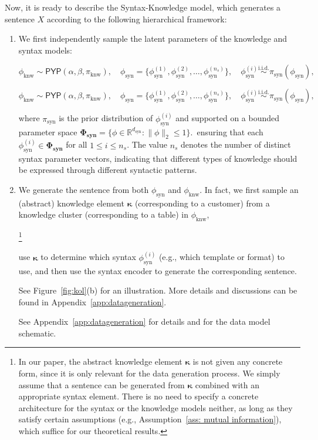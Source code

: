 \documentclass[11pt]{article}
\theoremstyle{plain}
\theoremstyle{definition}
\newcommand{\numsyntax}{n_s}
\newcommand{\knwModel}{\phi_{\text{knw}}}
\newcommand{\synModel}{\phi_{\text{syn}}}
\newcommand{\synfamily}{\mathbf{\Phi_{\text{syn}}}}
\newcommand{\syndimension}{d_{\text{syn}}}
\newcommand{\PYP}{\mathsf{PYP}}
\newcommand{\basemeasure}{\pi_{\text{knw}}}
\newcommand{\synprior}{\pi_{\text{syn}}}
\newcommand{\Knwelem}{\boldsymbol{\kappa}}
\begin{document}
Now, it is ready to describe the Syntax-Knowledge model, which generates a sentence \( X \) according to the following hierarchical framework:
\begin{enumerate}
    \item We first independently sample the latent parameters of the knowledge and syntax models:
    \begin{arxiv}
    \[
    \knwModel \sim \PYP(\alpha, \beta, \basemeasure),\quad 
    \synModel=\{\synModel^{(1)},\synModel^{(2)},\dots,
    \synModel^{(\numsyntax)}\},\quad 
    \synModel^{(i)} \overset{\text{i.i.d.}}{\sim} \synprior(\synModel),
    \]
    \end{arxiv}
    \begin{nips}
    $
    \knwModel \sim \PYP(\alpha, \beta, \basemeasure),\quad 
    \synModel=\{\synModel^{(1)},\synModel^{(2)},\dots,
    \synModel^{(\numsyntax)}\},\quad 
    \synModel^{(i)} \overset{\text{i.i.d.}}{\sim} \synprior(\synModel),
    $
    \end{nips}
    where $\synprior$ is the prior distribution of $\synModel^{(i)}$ and supported on a bounded parameter space \( \synfamily = \{ \phi \in \mathbb{R}^{\syndimension} : \|\phi\|_2 \le 1 \} \).\, ensuring that each \( \synModel^{(i)} \in \synfamily \) for all \( 1\le i\le \numsyntax  \).
    The value \( \numsyntax \) denotes the number of distinct syntax parameter vectors, indicating that different types of knowledge should be expressed through different syntactic patterns.
    \item We generate the sentence from both 
    $\synModel$ and $\knwModel$. In fact, we first sample
    an (abstract) knowledge element $\Knwelem$
    (corresponding to a customer) from a knowledge cluster (corresponding to a table) in $\knwModel$,
    \begin{arxiv}
    \footnote{
       In our paper, the abstract knowledge element \(\Knwelem\) is not given any concrete form, since it is only relevant for the data generation process. We simply assume that a sentence can be generated from \(\Knwelem\) combined with an appropriate syntax element. There is no need to specify a concrete architecture for the syntax or the knowledge models neither, as long as they satisfy certain assumptions (e.g., Assumption~\ref{ass: mutual information}), which suffice for our theoretical results.
    }
    \end{arxiv}
    use $\Knwelem$ to determine which syntax $\synModel^{(i)}$ (e.g., which template or format) to use, and then use the syntax encoder to generate the corresponding sentence. 
    \begin{arxiv}
         See Figure~\ref{fig:kol}(b) for an illustration. More details and discussions can be found in Appendix~\ref{app:datageneration}.
    \end{arxiv}
    \begin{nips}
        See Appendix~\ref{app:datageneration} for details and  for the data model schematic.
    \end{nips}
    
\end{enumerate}
\end{document}
